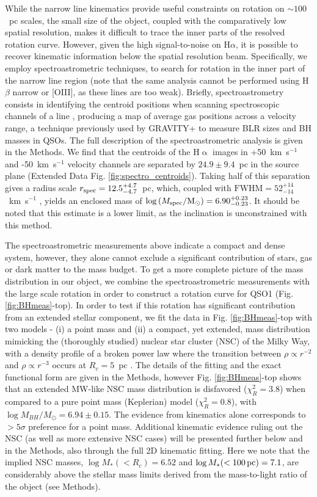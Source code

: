 \documentclass[twocolumn, fleqn]{doc_class}
\newcommand{\Halpha}{\ensuremath{\mathrm{H}\upalpha}\xspace}
\begin{document}
While the narrow line kinematics provide useful constraints on rotation on $\sim 100$~pc scales, the small size of the object, coupled with the comparatively low spatial resolution,
makes it difficult to trace the inner parts of the resolved rotation curve. However, given the high signal-to-noise on H$\alpha$, it is possible to recover kinematic information below the spatial resolution beam. Specifically, we employ spectroastrometric techniques, to search for rotation in the inner part of the narrow line region (note that the same analysis cannot be performed using H$\beta$ narrow or [OIII], as these lines are too weak). Briefly, spectroastrometry consists in identifying the centroid positions when scanning spectroscopic channels of a line , producing a map of average gas positions across a velocity range, a technique previously used by GRAVITY+ to measure BLR sizes and BH masses in QSOs. The full description of the spectroastrometric analysis is given in the Methods. We find that the centroids of the \Halpha images in +50~km~s$^{-1}$ and -50~km~s$^{-1}$ velocity channels are separated by $24.9\pm 9.4$~pc in the source plane (Extended Data Fig. \ref{fig:spectro_centroids}). Taking half of this separation gives a radius scale $r_{\rm spec} = 12.5_{-4.7}^{+4.7}$~pc, which, coupled with $\mathrm{FWHM}=52_{-14}^{+14}$~km~s$^{-1}$ ,  yields an enclosed mass of $\log{(M_{\rm spec}/\mathrm{M}_{\odot})} = 6.90_{-0.23}^{+0.23}$. It should be noted that this estimate is a lower limit, as the inclination is unconstrained with this method.

The spectroastrometric measurements above indicate a compact and dense system, however, they alone cannot exclude a significant contribution of stars, gas or dark matter to the mass budget. To get a more complete picture of the mass distribution in our object, we combine the spectroastrometric measurements with the large scale rotation in order to construct a rotation curve for QSO1 (Fig. \ref{fig:BHmeas}-top). In order to test if this rotation has significant contribution from an extended stellar component, we fit the data in Fig. \ref{fig:BHmeas}-top with two models - (i) a point mass and (ii) a compact, yet extended, mass distribution mimicking the (thoroughly studied) nuclear star cluster (NSC) of the Milky Way, with a density profile of a broken power law where the transition between $\rho \propto r^{-2}$ and $\rho \propto r^{-3}$ occurs at $R_c = 5$~pc . The details of the fitting and the exact functional form are given in the Methods, however Fig. \ref{fig:BHmeas}-top shows that an extended MW-like NSC mass distribution is disfavored ($\chi^2_R=3.8$) when compared to a pure point mass (Keplerian) model ($\chi^2_R=0.8$), with $\log{M_{BH}/M_{\odot}} = 6.94 \pm 0.15$. The evidence from kinematics alone corresponds to $>5\sigma$ preference for a point mass. 
Additional kinematic evidence ruling out the NSC (as well as more extensive NSC cases) will be presented further below and in the Methods, also through the full 2D kinematic fitting.
Here we note that the implied NSC masses, $\log{M_*(<R_c)} = 6.52$ and $\log{M_*(<100 \, {\rm pc})} = 7.1$, are considerably above the stellar mass limits derived from the mass-to-light ratio of the object (see Methods).
\end{document}
